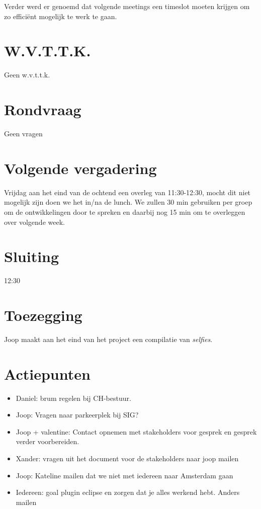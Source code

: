 \documentclass{article}
\begin{document}
Verder werd er genoemd dat volgende meetings een timeslot moeten krijgen om zo efficiënt mogelijk te werk te gaan. 

\section{W.V.T.T.K.}
Geen w.v.t.t.k. 

\section{Rondvraag}
Geen vragen

\section{Volgende vergadering}
Vrijdag aan het eind van de ochtend een overleg van 11:30-12:30, mocht dit niet mogelijk zijn doen we het in/na de lunch. We zullen 30 min gebruiken per groep om de ontwikkelingen door te spreken en daarbij nog 15 min  om te overleggen over volgende week.  

\section{Sluiting}
12:30

\section{Toezegging}
Joop maakt aan het eind van het project een compilatie van \emph{selfies}.

\section{Actiepunten}
\begin{itemize}
\item Daniel: brum regelen bij CH-bestuur. 
\item Joop: Vragen naar parkeerplek bij SIG? 
\item Joop + valentine: Contact opnemen met stakeholders voor gesprek en gesprek verder voorbereiden. 
\item Xander: vragen uit het document voor de stakeholders naar joop mailen 
\item Joop: Kateline mailen dat we niet met iedereen naar Amsterdam gaan
\item Iedereen: goal plugin eclipse en zorgen dat je alles werkend hebt. Anders mailen 

\end{itemize}
\end{document}
